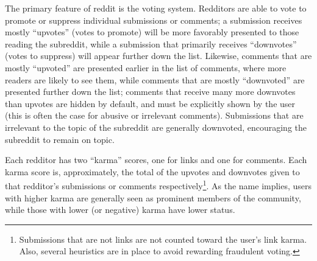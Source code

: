 \documentclass[journal, draftclsnofoot]{./styles/IEEEtran}
\begin{document}
The primary feature of reddit is the voting system. Redditors are able
to vote to promote or suppress individual submissions or comments; a
submission receives mostly ``upvotes'' (votes to promote) will be more
favorably presented to those reading the subreddit, while a submission
that primarily receives ``downvotes'' (votes to suppress) will appear
further down the list. Likewise, comments that are mostly ``upvoted''
are presented earlier in the list of comments, where more readers are
likely to see them, while comments that are mostly ``downvoted'' are
presented further down the list; comments that receive many more
downvotes than upvotes are hidden by default, and must be explicitly
shown by the user (this is often the case for abusive or irrelevant
comments). Submissions that are irrelevant to the topic of the subreddit
are generally downvoted, encouraging the subreddit to remain on topic.

Each redditor has two ``karma'' scores, one for links and one for
comments. Each karma score is, approximately, the total of the upvotes
and downvotes given to that redditor's submissions or comments
respectively\footnote{Submissions that are not links are not counted
toward the user's link karma. Also, several heuristics are in place to
avoid rewarding fraudulent voting.}. As the name implies, users with
higher karma are generally seen as prominent members of the community,
while those with lower (or negative) karma have lower status.
\end{document}
